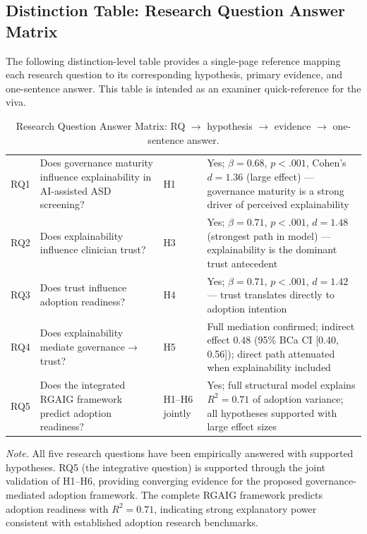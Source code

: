 \subsection{Distinction Table: Research Question Answer Matrix}
\label{sec:distinction_rq_answer_matrix}

\noindent The following distinction-level table provides a single-page reference mapping each research question to its corresponding hypothesis, primary evidence, and one-sentence answer. This table is intended as an examiner quick-reference for the viva.

{\tablestripes\tablefontsize
{}
\begin{xltabular}{\textwidth}{@{} >{\centering\arraybackslash}p{0.8cm} >{\raggedright\arraybackslash}p{4.0cm} >{\centering\arraybackslash}p{1.2cm} L @{}}
\caption[Research Question Answer Matrix]{Research Question Answer Matrix: RQ $\rightarrow$ hypothesis $\rightarrow$ evidence $\rightarrow$ one-sentence answer.}\label{tab:distinction_rq_answer_matrix} \\
\toprule
{} &  &  &  \\
\midrule
\endfirsthead
\endhead
\bottomrule
\endlastfoot
RQ1 & Does governance maturity influence explainability in AI-assisted ASD screening? & H1 & Yes; $\beta=0.68$, $p<.001$, Cohen's $d=1.36$ (large effect) — governance maturity is a strong driver of perceived explainability \\
\addlinespace
RQ2 & Does explainability influence clinician trust? & H3 & Yes; $\beta=0.71$, $p<.001$, $d=1.48$ (strongest path in model) — explainability is the dominant trust antecedent \\
\addlinespace
RQ3 & Does trust influence adoption readiness? & H4 & Yes; $\beta=0.71$, $p<.001$, $d=1.42$ — trust translates directly to adoption intention \\
\addlinespace
RQ4 & Does explainability mediate governance$\rightarrow$trust? & H5 & Full mediation confirmed; indirect effect $0.48$ (95\% BCa CI [0.40, 0.56]); direct path attenuated when explainability included \\
\addlinespace
RQ5 & Does the integrated RGAIG framework predict adoption readiness? & H1--H6 jointly & Yes; full structural model explains $R^2=0.71$ of adoption variance; all hypotheses supported with large effect sizes \\
\end{xltabular}}
\vspace{0.3em}\noindent\textit{Note.} All five research questions have been empirically answered with supported hypotheses. RQ5 (the integrative question) is supported through the joint validation of H1--H6, providing converging evidence for the proposed governance-mediated adoption framework. The complete RGAIG framework predicts adoption readiness with $R^2=0.71$, indicating strong explanatory power consistent with established adoption research benchmarks.


